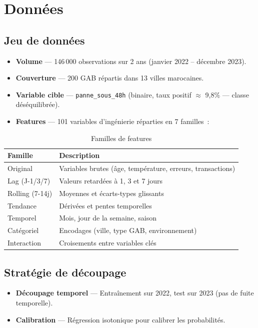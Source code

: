 \documentclass[a4paper,12pt]{report}
\begin{document}
\section{Données}

\subsection{Jeu de données}

\begin{itemize}
    \item \textbf{Volume} — 146\,000 observations sur 2 ans (janvier 2022 – décembre 2023).
    \item \textbf{Couverture} — 200 GAB répartis dans 13 villes marocaines.
    \item \textbf{Variable cible} — \texttt{panne\_sous\_48h} (binaire, taux positif $\approx$ 9,8\% — classe déséquilibrée).
    \item \textbf{Features} — 101 variables d'ingénierie réparties en 7 familles~:
\end{itemize}

\begin{table}[h!]
\centering
\renewcommand{\arraystretch}{1.2}
\begin{tabular}{|l|l|}
\hline
\rowcolor{bpmblue!10}
\textbf{Famille} & \textbf{Description} \\
\hline
Original & Variables brutes (âge, température, erreurs, transactions) \\
\hline
Lag (J-1/3/7) & Valeurs retardées à 1, 3 et 7 jours \\
\hline
Rolling (7-14j) & Moyennes et écarts-types glissants \\
\hline
Tendance & Dérivées et pentes temporelles \\
\hline
Temporel & Mois, jour de la semaine, saison \\
\hline
Catégoriel & Encodages (ville, type GAB, environnement) \\
\hline
Interaction & Croisements entre variables clés \\
\hline
\end{tabular}
\caption{Familles de features}
\end{table}

\subsection{Stratégie de découpage}

\begin{itemize}
    \item \textbf{Découpage temporel} — Entraînement sur 2022, test sur 2023 (pas de fuite temporelle).
    \item \textbf{Calibration} — Régression isotonique pour calibrer les probabilités.
\end{itemize}
\end{document}
